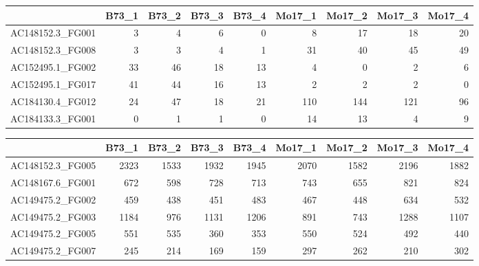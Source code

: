 \begin{table}[ht]
\centering
\begin{tabular}{rrrrrrrrr}
  \hline
 & B73\_1 & B73\_2 & B73\_3 & B73\_4 & Mo17\_1 & Mo17\_2 & Mo17\_3 & Mo17\_4 \\ 
  \hline
AC148152.3\_FG001 &   3 &   4 &   6 &   0 &   8 &  17 &  18 &  20 \\ 
  AC148152.3\_FG008 &   3 &   3 &   4 &   1 &  31 &  40 &  45 &  49 \\ 
  AC152495.1\_FG002 &  33 &  46 &  18 &  13 &   4 &   0 &   2 &   6 \\ 
  AC152495.1\_FG017 &  41 &  44 &  16 &  13 &   2 &   2 &   2 &   0 \\ 
  AC184130.4\_FG012 &  24 &  47 &  18 &  21 & 110 & 144 & 121 &  96 \\ 
  AC184133.3\_FG001 &   0 &   1 &   1 &   0 &  14 &  13 &   4 &   9 \\ 
   \hline
\end{tabular}
\end{table}



\begin{table}[ht]
\centering
\begin{tabular}{rrrrrrrrr}
  \hline
 & B73\_1 & B73\_2 & B73\_3 & B73\_4 & Mo17\_1 & Mo17\_2 & Mo17\_3 & Mo17\_4 \\ 
  \hline
AC148152.3\_FG005 & 2323 & 1533 & 1932 & 1945 & 2070 & 1582 & 2196 & 1882 \\ 
  AC148167.6\_FG001 & 672 & 598 & 728 & 713 & 743 & 655 & 821 & 824 \\ 
  AC149475.2\_FG002 & 459 & 438 & 451 & 483 & 467 & 448 & 634 & 532 \\ 
  AC149475.2\_FG003 & 1184 & 976 & 1131 & 1206 & 891 & 743 & 1288 & 1107 \\ 
  AC149475.2\_FG005 & 551 & 535 & 360 & 353 & 550 & 524 & 492 & 440 \\ 
  AC149475.2\_FG007 & 245 & 214 & 169 & 159 & 297 & 262 & 210 & 302 \\ 
   \hline
\end{tabular}
\end{table}





